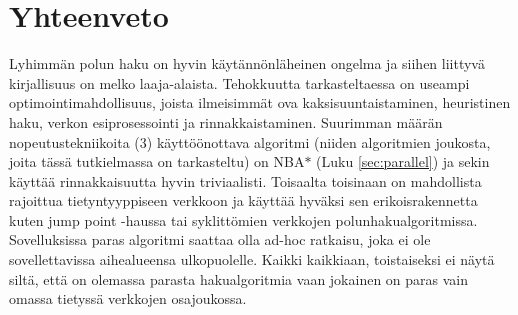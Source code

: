 \documentclass[finnish]{tktltiki2}
\theoremstyle{definition}
\theoremstyle{remark}
\begin{document}
\section{Yhteenveto}
\label{sec:summary}
Lyhimmän polun haku on hyvin käytännönläheinen ongelma ja siihen liittyvä kirjallisuus on melko laaja-alaista. Tehokkuutta tarkasteltaessa on useampi optimointimahdollisuus, joista ilmeisimmät ova kaksisuuntaistaminen, heuristinen haku, verkon esiprosessointi ja rinnakkaistaminen. Suurimman määrän nopeutustekniikoita (3) käyttöönottava algoritmi (niiden algoritmien joukosta, joita tässä tutkielmassa on tarkasteltu) on NBA$\ast$ (Luku \ref{sec:parallel}) ja sekin käyttää rinnakkaisuutta hyvin triviaalisti. Toisaalta toisinaan on mahdollista rajoittua tietyntyyppiseen verkkoon ja käyttää hyväksi sen erikoisrakennetta kuten jump point -haussa tai syklittömien verkkojen polunhakualgoritmissa. Sovelluksissa paras algoritmi saattaa olla ad-hoc ratkaisu, joka ei ole sovellettavissa aihealueensa ulkopuolelle. Kaikki kaikkiaan, toistaiseksi ei näytä siltä, että on olemassa parasta hakualgoritmia vaan jokainen on paras vain omassa tietyssä verkkojen osajoukossa.







% 
\end{document}
